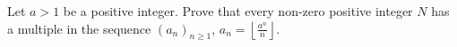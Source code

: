 Let $ a>1$ be a positive integer. Prove that every non-zero positive integer $ N$ has a multiple in the sequence $ (a_n)_{n\ge1}$, $ a_n=\left\lfloor\frac{a^n}n\right\rfloor$.